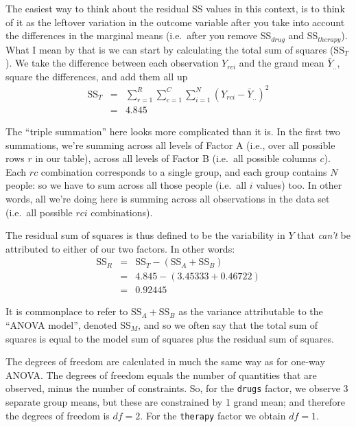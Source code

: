 \documentclass[
  11pt,
  a4paper,
  twoside,symmetric,openright]{book}
\theoremstyle{break}
\theoremstyle{break}
\begin{document}
The easiest way to think about the residual SS values in this context, is to think of it as the leftover variation in the outcome variable after you take into account the differences in the marginal means (i.e.~after you remove SS\(_{drug}\) and SS\(_{therapy}\)). What I mean by that is we can start by calculating the total sum of squares (SS\(_T\)). We take the difference between each observation \(Y_{rci}\) and the grand mean \(\bar{Y}_{..}\), square the differences, and add them all up
\[
\begin{array}{rcl}
\mbox{SS}_T &=& \sum_{r=1}^R \sum_{c=1}^C \sum_{i=1}^N \left( Y_{rci} - \bar{Y}_{..}\right)^2
    \\
    &=& 4.845
\end{array}
\]

The ``triple summation'' here looks more complicated than it is. In the first two summations, we're summing across all levels of Factor A (i.e., over all possible rows \(r\) in our table), across all levels of Factor B (i.e.~all possible columns \(c\)). Each \(rc\) combination corresponds to a single group, and each group contains \(N\) people: so we have to sum across all those people (i.e.~all \(i\) values) too. In other words, all we're doing here is summing across all observations in the data set (i.e.~all possible \(rci\) combinations).

The residual sum of squares is thus defined to be the variability in \(Y\) that \emph{can't} be attributed to either of our two factors. In other words:
\[
\begin{array}{rcl}
\mbox{SS}_R &=& \mbox{SS}_T - (\mbox{SS}_A + \mbox{SS}_B)
    \\
    &=& 4.845 - (3.45333 + 0.46722)
    \\
    &=& 0.92445
\end{array}
\]

It is commonplace to refer to \(\mbox{SS}_A + \mbox{SS}_B\) as the variance attributable to the ``ANOVA model'', denoted SS\(_M\), and so we often say that the total sum of squares is equal to the model sum of squares plus the residual sum of squares.

The degrees of freedom are calculated in much the same way as for one-way ANOVA. The degrees of freedom equals the number of quantities that are observed, minus the number of constraints. So, for the \texttt{drugs} factor, we observe 3 separate group means, but these are constrained by 1 grand mean; and therefore the degrees of freedom is \(df = 2\). For the \texttt{therapy} factor we obtain \(df=1\).
\end{document}
